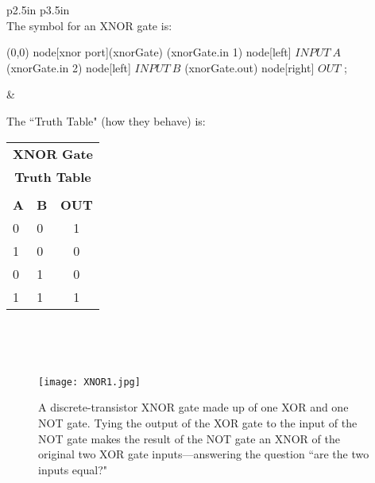 \medskip
\begin{center}

\begin{tabular}{p{2.5in} p{3.5in} }
\hline\\[\negsep]

The symbol for an XNOR gate is:

\vspace{0.25in}

\begin{circuitikz}
\draw
	(0,0) node[xnor port](xnorGate) {}
	(xnorGate.in 1) node[left] {{\color{red}$INPUT~A$}}
	(xnorGate.in 2) node[left] {{\color{red}$INPUT~B$}}
	(xnorGate.out) node[right] {{\color{red}$OUT$}}
;
\end{circuitikz}

&

\centering

The ``Truth Table" (how they behave) is: 
\vspace{0.15in}

\begin{tabular}{ll | c}
\multicolumn{3}{c}{\textbf{XNOR Gate }}\\
\multicolumn{3}{c}{\textbf{Truth Table}}\\
\hline\\[\negsep]
\textbf{A} & \textbf{B} & \textbf{OUT}\\
\hline
0 & 0 & 1  \\
1 & 0 & 0  \\
0 & 1 & 0  \\
1 & 1 & 1  \\
\hline
\end{tabular}
\\
\tabularnewline

\hline\\[\negsep]

\end{tabular}
\end{center}

\bigskip

\begin{figure}[hb!]
\begin{center}
\texttt{[image: XNOR1.jpg]}
\caption{A discrete-transistor XNOR gate made up of one XOR and one NOT gate. Tying the output of the XOR gate to the input of the NOT gate makes the result of the NOT gate an XNOR of the original two XOR gate inputs---answering the question ``are the two inputs equal?"}
\end{center}
\end{figure}

